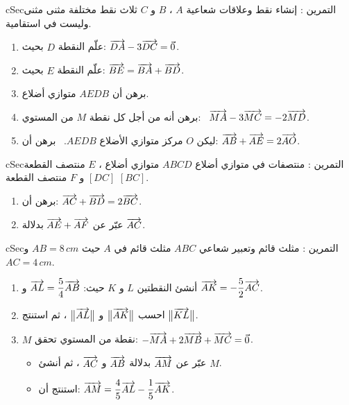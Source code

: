 \documentclass[12pt,a4paper]{article}
\newenvironment{BOX}[2]{\begin{otherlanguage}{english}\begin{arbox}{#1}{#2}}{\end{arbox}\end{otherlanguage}}
\newcounter{exo}
\newenvironment{tamrin}[1]{\stepcounter{exo}\begin{BOX}{cSec}{التمرين \theexo: #1}}{\end{BOX}}
\newenvironment{sq}{\begin{itemize}[leftmargin=2.4em,itemsep=3pt]}{\end{itemize}}
\newcommand{\qa}{\item[(أ)]}\newcommand{\qb}{\item[(ب)]}\newcommand{\qc}{\item[(جـ)]}\newcommand{\qd}{\item[(د)]}\newcommand{\qe}{\item[(هـ)]}
\begin{document}
\begin{tamrin}{إنشاء نقط وعلاقات شعاعية}
$A$ ، $B$ و $C$ ثلاث نقط مختلفة مثنى مثنى وليست في استقامية.
\begin{enumerate}
\item علّم النقطة $D$ بحيث: $\overrightarrow{DA}-3\overrightarrow{DC}=\vec0$.
\item علّم النقطة $E$ بحيث: $\overrightarrow{BE}=\overrightarrow{BA}+\overrightarrow{BD}$.
\item برهن أن $AEDB$ متوازي أضلاع.
\item برهن أنه من أجل كل نقطة $M$ من المستوي: \ $\overrightarrow{MA}-3\overrightarrow{MC}=-2\overrightarrow{MD}$.
\item ليكن $O$ مركز متوازي الأضلاع $AEDB$. \ برهن أن: $\overrightarrow{AB}+\overrightarrow{AE}=2\overrightarrow{AO}$.
\end{enumerate}
\end{tamrin}

\begin{tamrin}{منتصفات في متوازي أضلاع}
$ABCD$ متوازي أضلاع ، $E$ منتصف القطعة $[DC]$ و $F$ منتصف القطعة $[BC]$.
\begin{enumerate}
\item برهن أن: $\overrightarrow{AC}+\overrightarrow{BD}=2\overrightarrow{BC}$.
\item عبّر عن $\overrightarrow{AE}+\overrightarrow{AF}$ بدلالة $\overrightarrow{AC}$.
\end{enumerate}
\end{tamrin}

\begin{tamrin}{مثلث قائم وتعبير شعاعي}
$ABC$ مثلث قائم في $A$ حيث $AB=8\,cm$ و $AC=4\,cm$.
\begin{enumerate}
\item أنشئ النقطتين $L$ و $K$ حيث: $\overrightarrow{AL}=\dfrac54\overrightarrow{AB}$ و $\overrightarrow{AK}=-\dfrac52\overrightarrow{AC}$.
\item احسب $\big\|\overrightarrow{AK}\big\|$ و $\big\|\overrightarrow{AL}\big\|$ ، ثم استنتج $\big\|\overrightarrow{KL}\big\|$.
\item $M$ نقطة من المستوي تحقق: $-\overrightarrow{MA}+2\overrightarrow{MB}+\overrightarrow{MC}=\vec0$.
\begin{sq}
\qa عبّر عن $\overrightarrow{AM}$ بدلالة $\overrightarrow{AB}$ و $\overrightarrow{AC}$ ، ثم أنشئ $M$.
\qb استنتج أن: $\overrightarrow{AM}=\dfrac45\overrightarrow{AL}-\dfrac15\overrightarrow{AK}$.
\end{sq}
\end{enumerate}
\end{tamrin}

\end{document}
